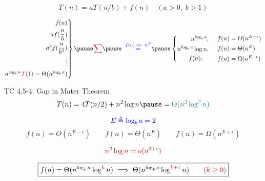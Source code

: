 
\begin{frame}{}
  \centerline{}
\end{frame}

\begin{frame}{}
  \[
    T(n) = aT(n/b) + f(n) \quad (a > 0,\; b > 1) 
  \]

  \pause
  \begin{center}
    {}
  \end{center}

  \pause
  \vspace{0.30cm}
  \begin{equation*}
    \left.\begin{aligned}
      f(n) \\
      af(\frac{n}{b}) \\
      a^2f(\frac{n}{b^2}) \\
      \vdots \\
	  a^{\log_b n} \red{T(1)} = \Theta(n^{\log_b a})
    \end{aligned}\right\}
    \pause
    \purple{\sum} \pause\;\; \blue{\overset{f(n) \;\text{\it vs. } n^{E}}{=}} \pause
	\left\{\begin{aligned}
      n^{\log_b a},		 \\
      n^{\log_b a}\log n, 	 \\
      f(n),		   \quad \\
    \end{aligned}\right.
    \quad \left.\begin{aligned}
      f(n) &= O(n^{E-\epsilon}) \\
      f(n) &= \Theta(n^E) \\
      f(n) &= \Omega(n^{E+\epsilon}) 
    \end{aligned}\right.
  \end{equation*}

\end{frame}

\begin{frame}{}
  \begin{exampleblock}{TC 4.5-4: Gap in Mater Theorem}
    \[
      {T(n) = 4T(n/2) + n^2 \log n \pause = \teal{\Theta(n^2 \log^{2} n)}}
    \]
  \end{exampleblock}

  \pause
  \[
    \textcolor{blue}{E \triangleq \log_b a = 2}
  \]
  \[
    f(n) = O(n^{E - \epsilon}) \qquad f(n) = \Theta(n^E) \qquad f(n) = \Omega(n^{E + \epsilon})
  \]

  \pause
  \[
    \textcolor{red}{n^2 \log n = o(n^{2 + \epsilon})}
  \]

  \pause
  \[
    \boxed{f(n) = \Theta(n^{\log_b a} \log^{\textcolor{red}{k}}n) \implies \Theta(n^{\log_b a} \log^{\textcolor{red}{k+1}}n) \qquad \textcolor{red}{(k \ge 0)}}
  \]
\end{frame}

